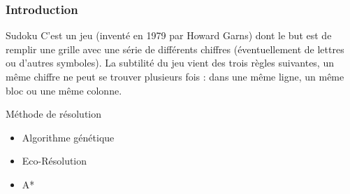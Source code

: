 
\begin{frame}
    \frametitle{Introduction}
    \begin{block}{Sudoku}
    			C’est un jeu (inventé en 1979 par Howard Garns) dont le but est de remplir une grille avec une série de
différents chiffres (éventuellement de lettres ou d’autres symboles). La subtilité du jeu vient des trois règles
suivantes, un même chiffre ne peut se trouver plusieurs fois : dans une même ligne, un même bloc ou une même colonne.
    \end{block}
    \begin{block}{Méthode de résolution}
    		\begin{itemize}
    			\item Algorithme génétique
    			\item Eco-Résolution
    			\item A*
    		\end{itemize}
    \end{block}
\end{frame}
